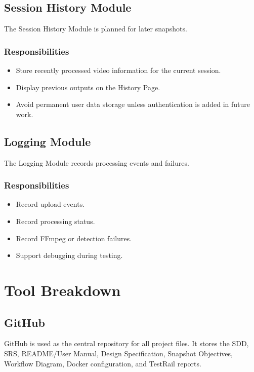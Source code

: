 \documentclass[12pt]{article}
\begin{document}
\subsection{Session History Module}
The Session History Module is planned for later snapshots.

\subsubsection*{Responsibilities}
\begin{itemize}[noitemsep]
    \item Store recently processed video information for the current session.
    \item Display previous outputs on the History Page.
    \item Avoid permanent user data storage unless authentication is added in future work.
\end{itemize}

\subsection{Logging Module}
The Logging Module records processing events and failures.

\subsubsection*{Responsibilities}
\begin{itemize}[noitemsep]
    \item Record upload events.
    \item Record processing status.
    \item Record FFmpeg or detection failures.
    \item Support debugging during testing.
\end{itemize}

\newpage

\section{Tool Breakdown}

\subsection{GitHub}
GitHub is used as the central repository for all project files. It stores the SDD, SRS, README/User Manual, Design Specification, Snapshot Objectives, Workflow Diagram, Docker configuration, and TestRail reports.
\end{document}
